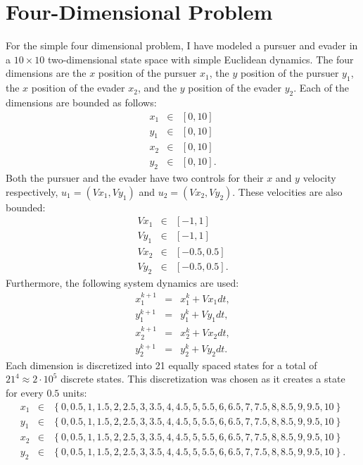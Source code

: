  

\section{Four-Dimensional Problem}
For the simple four dimensional problem, I have modeled a pursuer and evader in a $10 \times 10$ two-dimensional  state space with simple Euclidean dynamics. The four dimensions are the $x$ position of the pursuer $x_1$, the $y$ position of the pursuer $y_1$, the $x$ position of the evader $x_2$, and the $y$ position of the evader $y_2$. Each of the dimensions are bounded as follows:
\begin{eqnarray*}
x_1 & \in & [0,10]\\
y_1 & \in & [0,10]\\
x_2 & \in & [0,10]\\
y_2 & \in & [0,10].
\end{eqnarray*} 
Both the pursuer and the evader have two controls for their $x$ and $y$ velocity respectively, $u_1 = (Vx_1,Vy_1)$ and $u_2 = (Vx_2,Vy_2)$. These velocities are also bounded:
\begin{eqnarray*}
Vx_1 & \in & [-1,1]\\
Vy_1 & \in & [-1,1]\\
Vx_2 & \in & [-0.5,0.5]\\
Vy_2 & \in & [-0.5,0.5].
\end{eqnarray*} 
Furthermore, the following system dynamics are used:
\begin{eqnarray}\label{eqns1}
x_1^{k+1} & = & x_1^k +Vx_1dt,\\
y_1^{k+1} & = & y_1^k +Vy_1dt,\\
x_2^{k+1} & = & x_2^k +Vx_2dt,\\
y^{k+1}_2 & = & y_2^k +Vy_2dt.
\end{eqnarray}
Each dimension is discretized into 21 equally spaced states for a total of $21^4 \approx 2\cdot10^5$ discrete states. This discretization was chosen as it creates a state for every $0.5$ units:
\begin{eqnarray*}
x_1 & \in & \left\{0,0.5,1,1.5,2,2.5,3,3.5,4,4.5,5,5.5,6,6.5,7,7.5,8,8.5,9,9.5,10\right\}\\
y_1 & \in & \left\{0,0.5,1,1.5,2,2.5,3,3.5,4,4.5,5,5.5,6,6.5,7,7.5,8,8.5,9,9.5,10\right\}\\
x_2 & \in & \left\{0,0.5,1,1.5,2,2.5,3,3.5,4,4.5,5,5.5,6,6.5,7,7.5,8,8.5,9,9.5,10\right\}\\
y_2 & \in & \left\{0,0.5,1,1.5,2,2.5,3,3.5,4,4.5,5,5.5,6,6.5,7,7.5,8,8.5,9,9.5,10\right\}.
\end{eqnarray*} 
 
